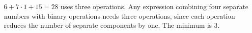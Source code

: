 $6+7\cdot1+15=28$ uses three operations. Any expression combining four separate numbers with binary operations needs three operations, since each operation reduces the number of separate components by one. The minimum is $\boxed3$.
